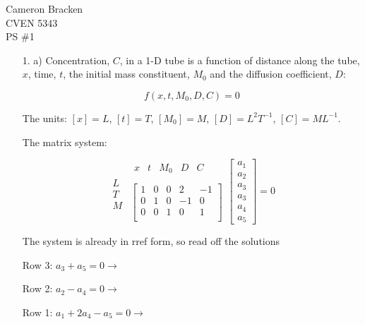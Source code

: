 \documentclass[11pt]{article}
\begin{document}
\begin{flushright}
Cameron Bracken\\
CVEN 5343\\
PS \#1
\end{flushright}

\begin{enumerate}

\item[1. a)] Concentration, $C$, in a 1-D tube is a function of distance along the tube, $x$, time, $t$, the initial mass constituent, $M_0$ and the diffusion coefficient, $D$:

$$f(x,t,M_0,D,C)=0$$

The units: $[x]= L$, $[t]=T$, $[M_0]=M$, $[D] = L^2T^{-1}$, $[C]=ML^{-1}$. 

The matrix system:

$$
\begin{array}{c}
\\L\\T\\M
\end{array}
\begin{array}{c}
	\begin{array}{lllll}
		x & t & M_0 & D & C\\
	\end{array}\\
	\left[
	\begin{array}{ccccc}
		1 & 0 & 0 & 2 & -1\\
		0 & 1 & 0 & -1 & 0\\
		0 & 0 & 1 & 0 & 1\\
	\end{array}
	\right]
\end{array}
\left[
\begin{array}{c}
a_1\\a_2\\a_3\\a_3\\a_4\\a_5
\end{array}
\right]
=0
$$

The system is already in rref form, so read off the solutions

Row 3: $a_3+a_5=0 \longrightarrow$ 

Row 2: $a_2-a_4=0  \longrightarrow$ 

Row 1: $a_1+2a_4-a_5=0  \longrightarrow$ 


\end{enumerate}
\end{document}
